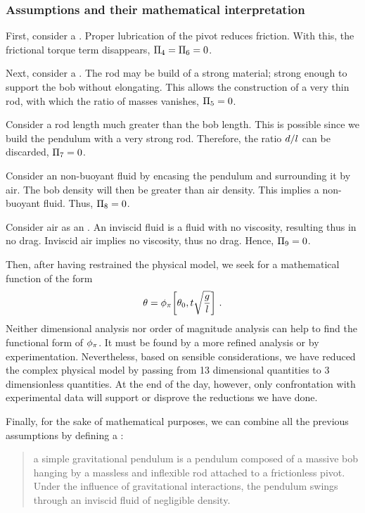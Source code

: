 \subsubsection{Assumptions and their mathematical interpretation}\label{subsec:mathinterpretation}
First, consider a . Proper lubrication of the pivot reduces friction. With this, the frictional torque term disappears, $\Pi_4 = \Pi_6 = 0$.

Next, consider a . The rod may be build of a strong material; strong enough to support the bob without elongating. This allows the construction of a very thin rod, with which the ratio of masses vanishes, $\Pi_5 = 0$.

Consider a rod length much greater than the bob length. This is possible since we build the pendulum with a very strong rod. Therefore, the ratio $d/l$ can be discarded, $\Pi_7 = 0$.

Consider an non-buoyant fluid by encasing the pendulum and surrounding it by air. The bob density will then be greater than air density. This implies a non-buoyant fluid. Thus, $\Pi_8 = 0$.

Consider air as an . An inviscid fluid is a fluid with no viscosity, resulting thus in no drag. Inviscid air implies no viscosity, thus no drag. Hence, $\Pi_9 = 0$.

Then, after having restrained the physical model, we seek for a mathematical function of the form
\begin{equation}\label{eq:simplegravpendulumdimanalysis}
\theta = \phi_{\pi}\!\left[{
            \theta_0, 
            t\sqrt{\dfrac{g}{l}}
            }\right]\,.
\end{equation}
Neither dimensional analysis nor order of magnitude analysis can help to find the functional form of $\phi_{\pi}$. It must be found by a more refined analysis or by experimentation. Nevertheless, based on sensible considerations, we have reduced the complex physical model by passing from 13 dimensional quantities to 3 dimensionless quantities. At the end of the day, however, only confrontation with experimental data will support or disprove the reductions we have done.

Finally, for the sake of mathematical purposes, we can combine all the previous assumptions by defining a :
\begin{quote}
a simple gravitational pendulum is a pendulum composed of a massive bob hanging by a massless and inflexible rod attached to a frictionless pivot. Under the influence of gravitational interactions, the pendulum swings through an inviscid fluid of negligible density.
\end{quote}


